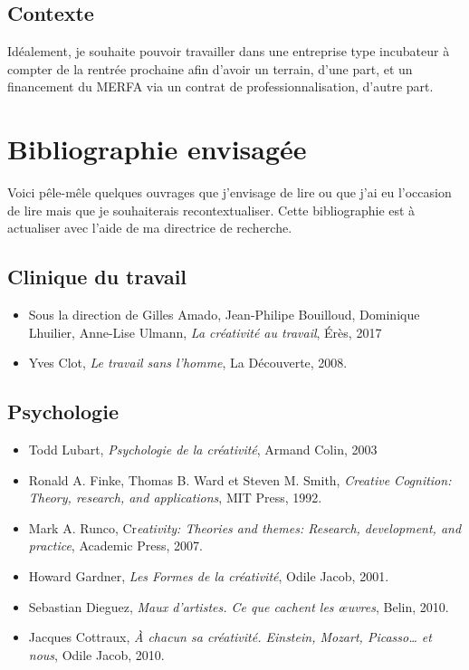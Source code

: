 \documentclass{article}
\begin{document}
\subsection{Contexte}

Idéalement, je souhaite pouvoir travailler dans une entreprise type incubateur à compter de la rentrée prochaine afin d'avoir un terrain, d'une part, et un financement du MERFA via un contrat de professionnalisation, d'autre part. 

\section{Bibliographie envisagée}

Voici pêle-mêle quelques ouvrages que j'envisage de lire ou que j'ai eu l'occasion de lire mais que je souhaiterais recontextualiser. Cette bibliographie est à actualiser avec l'aide de ma directrice de recherche. 

\subsection{Clinique du travail}

\begin{itemize}

\item Sous la direction de Gilles Amado, Jean-Philipe Bouilloud, Dominique Lhuilier, Anne-Lise Ulmann, \textit{La créativité au travail}, Érès, 2017
\item Yves Clot, \textit{Le travail sans l’homme}, La Découverte, 2008.

\end{itemize}

\subsection{Psychologie}

\begin{itemize}

\item Todd Lubart, \textit{Psychologie de la créativité}, Armand Colin, 2003
\item Ronald A. Finke, Thomas B. Ward et Steven M. Smith, \textit{Creative Cognition: Theory, research, and applications}, MIT Press, 1992.
\item Mark A. Runco, Cr\textit{eativity: Theories and themes: Research, development, and practice}, Academic Press, 2007.
\item Howard Gardner, \textit{Les Formes de la créativité}, Odile Jacob, 2001.
\item Sebastian Dieguez, \textit{Maux d’artistes. Ce que cachent les œuvres}, Belin, 2010.
\item Jacques Cottraux, \textit{À chacun sa créativité. Einstein, Mozart, Picasso… et nous}, Odile Jacob, 2010.

\end{itemize}
\end{document}
